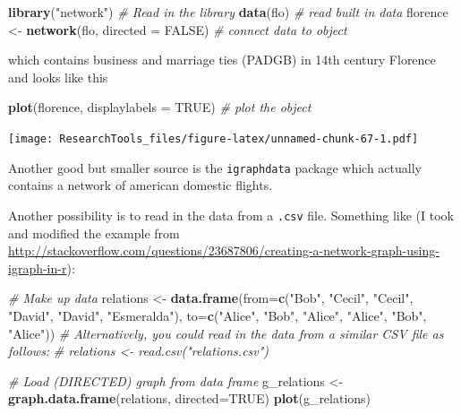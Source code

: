 \documentclass[]{article}
\newenvironment{Shaded}{\begin{snugshade}}{\end{snugshade}}
\newcommand{\KeywordTok}[1]{\textcolor[rgb]{0.13,0.29,0.53}{\textbf{#1}}}
\newcommand{\DataTypeTok}[1]{\textcolor[rgb]{0.13,0.29,0.53}{#1}}
\newcommand{\StringTok}[1]{\textcolor[rgb]{0.31,0.60,0.02}{#1}}
\newcommand{\CommentTok}[1]{\textcolor[rgb]{0.56,0.35,0.01}{\textit{#1}}}
\newcommand{\OtherTok}[1]{\textcolor[rgb]{0.56,0.35,0.01}{#1}}
\newcommand{\NormalTok}[1]{#1}
\theoremstyle{definition}
\theoremstyle{definition}
\theoremstyle{definition}
\theoremstyle{remark}
\begin{document}
\begin{Shaded}
\begin{Highlighting}[]
\KeywordTok{library}\NormalTok{(}\StringTok{"network"}\NormalTok{)                 }\CommentTok{# Read in the library}
\KeywordTok{data}\NormalTok{(flo)                          }\CommentTok{# read built in data}
\NormalTok{florence <-}\StringTok{ }\KeywordTok{network}\NormalTok{(flo, }\DataTypeTok{directed =} \OtherTok{FALSE}\NormalTok{) }\CommentTok{# connect data to object}
\end{Highlighting}
\end{Shaded}

which contains business and marriage ties (PADGB) in 14th century
Florence and looks like this

\begin{Shaded}
\begin{Highlighting}[]
\KeywordTok{plot}\NormalTok{(florence, }\DataTypeTok{displaylabels =} \OtherTok{TRUE}\NormalTok{) }\CommentTok{# plot the object}
\end{Highlighting}
\end{Shaded}

\texttt{[image: ResearchTools\_files/figure-latex/unnamed-chunk-67-1.pdf]}

Another good but smaller source is the \texttt{igraphdata} package which
actually contains a network of american domestic flights.

Another possibility is to read in the data from a \texttt{.csv} file.
Something like (I took and modified the example from
\url{http://stackoverflow.com/questions/23687806/creating-a-network-graph-using-igraph-in-r}):

\begin{Shaded}
\begin{Highlighting}[]
\CommentTok{# Make up data}
\NormalTok{relations <-}\StringTok{ }\KeywordTok{data.frame}\NormalTok{(}\DataTypeTok{from=}\KeywordTok{c}\NormalTok{(}\StringTok{"Bob"}\NormalTok{, }\StringTok{"Cecil"}\NormalTok{, }\StringTok{"Cecil"}\NormalTok{, }\StringTok{"David"}\NormalTok{, }\StringTok{"David"}\NormalTok{, }\StringTok{"Esmeralda"}\NormalTok{),}
                        \DataTypeTok{to=}\KeywordTok{c}\NormalTok{(}\StringTok{"Alice"}\NormalTok{, }\StringTok{"Bob"}\NormalTok{, }\StringTok{"Alice"}\NormalTok{, }\StringTok{"Alice"}\NormalTok{, }\StringTok{"Bob"}\NormalTok{, }\StringTok{"Alice"}\NormalTok{))}
\CommentTok{# Alternatively, you could read in the data from a similar CSV file as follows:}
\CommentTok{# relations <- read.csv("relations.csv")}

\CommentTok{# Load (DIRECTED) graph from data frame }
\NormalTok{g_relations <-}\StringTok{ }\KeywordTok{graph.data.frame}\NormalTok{(relations, }\DataTypeTok{directed=}\OtherTok{TRUE}\NormalTok{)}
\KeywordTok{plot}\NormalTok{(g_relations)}
\end{Highlighting}
\end{Shaded}
\end{document}
